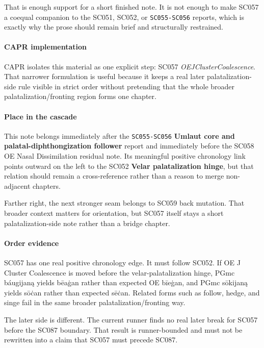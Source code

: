 \documentclass[
  british,
  a4paper,
]{article}
\begin{document}
That is enough support for a short finished note. It is not enough to
make SC057 a coequal companion to the SC051, SC052, or
\texttt{SC055-SC056} reports, which is exactly why the prose should
remain brief and structurally restrained.

\paragraph{CAPR implementation}\label{capr-implementation-35}

CAPR isolates this material as one explicit step: SC057
\emph{OEJClusterCoalescence}. That narrower formulation is useful
because it keeps a real later palatalization-side rule visible in strict
order without pretending that the whole broader palatalization/fronting
region forms one chapter.

\paragraph{Place in the cascade}\label{place-in-the-cascade-35}

This note belongs immediately after the \texttt{SC055-SC056}
\textbf{Umlaut core and palatal-diphthongization follower} report and
immediately before the SC058 OE Nasal Dissimilation residual note. Its
meaningful positive chronology link points outward on the left to the
SC052 \textbf{Velar palatalization hinge}, but that relation should
remain a cross-reference rather than a reason to merge non-adjacent
chapters.

Farther right, the next stronger seam belongs to SC059 back mutation.
That broader context matters for orientation, but SC057 itself stays a
short palatalization-side note rather than a bridge chapter.

\paragraph{Order evidence}\label{order-evidence-35}

SC057 has one real positive chronology edge. It must follow SC052. If OE
J Cluster Coalescence is moved before the velar-palatalization hinge,
PGmc báugijaną yields bēaġan rather than expected OE bīeġan, and PGmc
sōkijaną yields sōċan rather than expected sēċan. Related forms such as
follow, hedge, and singe fail in the same broader
palatalization/fronting way.

The later side is different. The current runner finds no real later
break for SC057 before the SC087 boundary. That result is runner-bounded
and must not be rewritten into a claim that SC057 must precede SC087.
\end{document}
